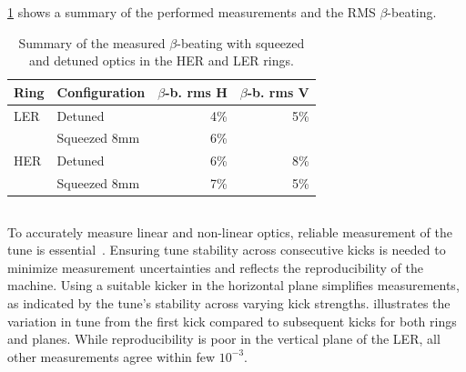 \cref{tab:kek:summary_beating} shows a summary of the performed measurements and the RMS
$\beta$-beating.

\begin{table}
    \centering
    \begin{tabular}{llrr}
        \toprule
        Ring & Configuration & $\beta$-b. rms H & $\beta$-b. rms V \\
        \midrule
        LER  &  Detuned      & 4\%              & 5\%   \\
            &  Squeezed 8mm & 6\%              &       \\
        HER  &  Detuned      & 6\%              & 8\%  \\
            &  Squeezed 8mm & 7\%              & 5\%  \\
        \bottomrule
    \end{tabular}
    \caption{Summary of the measured $\beta$-beating with squeezed and detuned optics in the HER
    and LER rings.}
    \label{tab:kek:summary_beating}
\end{table}



\FloatBarrier
\subsection{}

\FloatBarrier
\subsubsection{}

To accurately measure linear and non-linear optics, reliable measurement of the tune is
essential~\cite{thrane_measuring_2020}. Ensuring tune stability across consecutive kicks is needed
to minimize measurement uncertainties and reflects the reproducibility of the machine. Using a
suitable kicker in the horizontal plane simplifies measurements, as indicated by the tune's 
stability across varying kick strengths.  illustrates the variation in tune
from the first kick compared to subsequent kicks for both rings and planes.
While reproducibility is poor in the vertical plane of the LER, all other measurements agree within
few $10^{-3}$.

